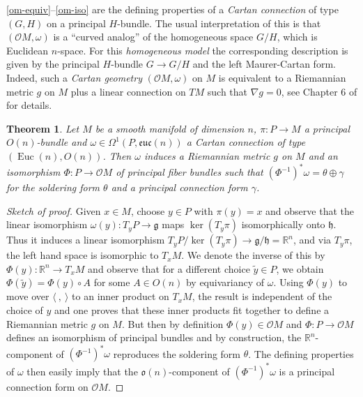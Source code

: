 \documentclass[12pt,a4paper]{amsart}
\def\frak{\mathfrak}
\def\Bbb{\mathbb}
\def\Cal{\mathcal}
\renewcommand{\o}{\circ}
\newcommand{\ga}{\gamma}
\newcommand{\om}{\omega}
\renewcommand{\th}{\theta}
\newcommand{\Ph}{\Phi}
\newcommand{\Om}{\Omega}
\newcommand{\Euc}{\operatorname{Euc}}
\newcommand{\euc}{\mathfrak{euc}}
\newcounter{theorem}
\numberwithin{theorem}{section}
\numberwithin{equation}{section}
\newtheorem{thm}[theorem]{Theorem}
\theoremstyle{definition}
\theoremstyle{remark}
\begin{document}
\eqref{om-equiv}--\eqref{om-iso} are the defining properties of a \textit{Cartan
  connection} of type $(G,H)$ on a principal $H$-bundle. The usual interpretation of
this is that $(\Cal OM,\om)$ is a ``curved analog'' of the homogeneous space $G/H$,
which is Euclidean $n$-space. For this \textit{homogeneous model} the corresponding
description is given by the principal $H$-bundle $G\to G/H$ and the left
Maurer-Cartan form. Indeed, such a \textit{Cartan geometry} $(\Cal OM,\om)$ on $M$ is
equivalent to a Riemannian metric $g$ on $M$ plus a linear connection on $TM$ such
that $\nabla g=0$, see Chapter 6 of \cite{Sharpe} for details.

\begin{thm}\label{thm3.1}
Let $M$ be a smooth manifold of dimension $n$, $\pi:P\to M$ a principal $O(n)$-bundle
and $\om\in\Om^1(P,\euc(n))$ a Cartan connection of type $(\Euc(n),O(n))$. Then $\om$
induces a Riemannian metric $g$ on $M$ and an isomorphism $\Ph:P\to \Cal OM$ of
principal fiber bundles such that $(\Ph^{-1})^*\om=\th\oplus\gamma$ for the soldering
form $\th$ and a principal connection form $\ga$.
\end{thm}
\begin{proof}[Sketch of proof] Given $x\in M$, choose $y\in P$ with $\pi(y)=x$ and
  observe that the linear isomorphism $\om(y):T_yP\to\frak g$ maps $\ker(T_y\pi)$
  isomorphically onto $\frak h$. Thus it induces a linear isomorphism
  $T_yP/\ker(T_y\pi)\to\frak g/\frak h=\Bbb R^n$, and via $T_y\pi$, the left hand
  space is isomorphic to $T_xM$.  We denote the inverse of this by $\Ph(y):\Bbb
  R^n\to T_xM$ and observe that for a different choice $\tilde y\in P$, we obtain
  $\Ph(\tilde y)=\Ph(y)\o A$ for some $A\in O(n)$ by equivariancy of $\om$. Using
  $\Ph(y)$ to move over $\langle\ ,\ \rangle$ to an inner product on $T_xM$, the
  result is independent of the choice of $y$ and one proves that these inner products
  fit together to define a Riemannian metric $g$ on $M$. But then by definition
  $\Ph(y)\in\Cal OM$ and $\Ph:P\to\Cal OM$ defines an isomorphism of principal
  bundles and by construction, the $\Bbb R^n$-component of $(\Ph^{-1})^*\om$
  reproduces the soldering form $\th$. The defining properties of $\om$ then easily
  imply that the $\frak o(n)$-component of $(\Ph^{-1})^*\om$ is a principal
  connection form on $\Cal OM$.
\end{proof}
\end{document}
